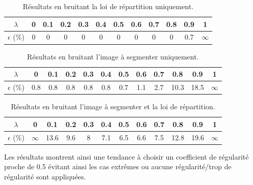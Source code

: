 \documentclass{article}
\begin{document}
\begin{table}[h!]
\begin{center}
  \begin{tabular}{|c|c|c|c|c|c|c|c|c|c|c|c|}
		\hline
		$\lambda$ & 0 & 0.1& 0.2 & 0.3 & 0.4 & 0.5 & 0.6 & 0.7 & 0.8 & 0.9 & 1\\
		\hline
		$\epsilon$ (\%) & 0 & 0 & 0 & 0 & 0 & 0 & 0 & 0 & 0 & 0.7 & $\infty$\\
		\hline
\end{tabular}
\end{center}
\caption{Résultats en bruitant la loi de répartition uniquement.}
\end{table}

\begin{table}[h!]
\begin{center}
  \begin{tabular}{|c|c|c|c|c|c|c|c|c|c|c|c|}
		\hline
		$\lambda$ & 0 & 0.1& 0.2 & 0.3 & 0.4 & 0.5 & 0.6 & 0.7 & 0.8 & 0.9 & 1\\
		\hline
		$\epsilon$ (\%) & 0.8 & 0.8 & 0.8 & 0.8 & 0.8 & 0.7 & 1.1 & 2.7 & 10.3 & 18.5 & $\infty$\\
		\hline
\end{tabular}
\end{center}
\caption{Résultats en bruitant l'image à segmenter uniquement.}
\end{table}

\begin{table}[h!]
\begin{center}
  \begin{tabular}{|c|c|c|c|c|c|c|c|c|c|c|c|}
		\hline
		$\lambda$ & 0 & 0.1& 0.2 & 0.3 & 0.4 & 0.5 & 0.6 & 0.7 & 0.8 & 0.9 & 1\\
		\hline
		$\epsilon$ (\%) & $\infty$ & 13.6 & 9.6 & 8 & 7.1 & 6.5 & 6.6 & 7.5 & 12.8 & 19.6 & $\infty$\\
		\hline
\end{tabular}
\end{center}
\caption{Résultats en bruitant l'image à segmenter et la loi de répartition.}
\end{table}

Les résultats montrent ainsi une tendance à choisir un coefficient de régularité proche de 0.5 évitant ainsi les cas extrêmes ou aucune régularité/trop de régularité sont appliquées.

\end{document}
